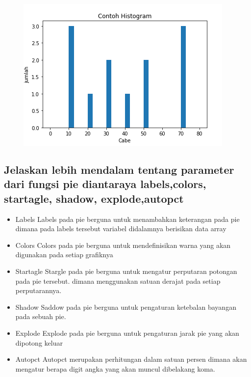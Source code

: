 

\begin{figure}[!htbp]
\centering
\includegraphics[scale=0.7]{figures/6/1174012/histo.PNG}
\caption{}
\label{}
\end{figure}

\subsection {Jelaskan lebih mendalam tentang parameter dari fungsi pie diantaraya labels,colors, startagle, shadow, explode,autopct}
\begin{itemize}
	\item Labels \newline
	Labels pada pie berguna untuk menambahkan keterangan pada pie dimana pada labels tersebut variabel 			didalamnya berisikan data array
	\item Colors \newline
	Colors pada pie berguna untuk mendefinisikan warna yang akan digunakan pada setiap grafiknya
	\item Startagle\newline
	Stargle pada pie berguna untuk mengatur perputaran potongan pada pie tersebut. dimana menggunakan 			satuan derajat pada setiap perputarannya.
	\item Shadow\newline
	Saddow pada pie berguna untuk pengaturan ketebalan bayangan pada sebuah pie.
	\item Explode\newline
	Explode pada pie berguna untuk pengaturan jarak pie yang akan dipotong keluar 
	\item Autopct\newline
	Autopct merupakan perhitungan dalam satuan persen dimana akan mengatur berapa digit angka yang akan 		muncul dibelakang 	koma.
\end{itemize}

